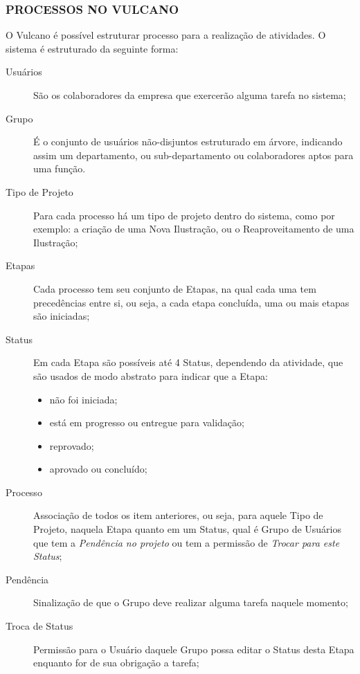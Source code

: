 \documentclass[
  12pt,            %
  openany,
  oneside,
  a4paper,         %
  english,      %
  brazil
]{article}
\numberwithin{figure}{section}
\numberwithin{table}{section}
\begin{document}
\subsubsection{PROCESSOS NO VULCANO}

O Vulcano é possível estruturar processo para a realização de atividades. O sistema é estruturado da seguinte forma:

\vspace{-5mm}
\begin{description}
  \item[Usuários] São os colaboradores da empresa que exercerão alguma tarefa no sistema;
  \item[Grupo] É o conjunto de usuários não-disjuntos estruturado em árvore, indicando assim um departamento, ou sub-departamento ou colaboradores aptos para uma função.
  \item[Tipo de Projeto] Para cada processo há um tipo de projeto dentro do sistema, como por exemplo: a criação de uma Nova Ilustração, ou o Reaproveitamento de uma Ilustração;
  \item[Etapas] Cada processo tem seu conjunto de Etapas, na qual cada uma tem precedências entre si, ou seja, a cada etapa concluída, uma ou mais etapas são iniciadas;
  \item[Status] Em cada Etapa são possíveis até 4 Status, dependendo da atividade, que são usados de modo abstrato para indicar que a Etapa:
  \vspace{-10mm}
  \begin{singlespace}
    \begin{itemize}
      \item não foi iniciada;
      \item está em progresso ou entregue para validação;
      \item reprovado;
      \item aprovado ou concluído;
    \end{itemize}
  \end{singlespace}
  \vspace{-5mm}
  \item[Processo] Associação de todos os item anteriores, ou seja, para aquele Tipo de Projeto, naquela Etapa quanto em um Status, qual é Grupo de Usuários que tem a \textit{Pendência no projeto} ou tem a permissão de \textit{Trocar para este Status};
  \item[Pendência] Sinalização de que o Grupo deve realizar alguma tarefa naquele momento;
  \item[Troca de Status] Permissão para o Usuário daquele Grupo possa editar o Status desta Etapa enquanto for de sua obrigação a tarefa;
\end{description}
\vspace{-5mm}
\end{document}

